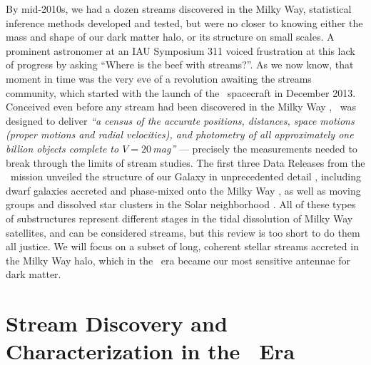 \documentclass[final,5p,times,twocolumn,authoryear]{elsarticle}
\begin{document}
By mid-2010s, we had a dozen streams discovered in the Milky Way, statistical inference methods developed and tested, but were no closer to knowing either the mass and shape of our dark matter halo, or its structure on small scales.
A prominent astronomer at an IAU Symposium 311 voiced frustration at this lack of progress by asking ``Where is the beef with streams?''.
As we now know, that moment in time was the very eve of a revolution awaiting the streams community, which started with the launch of the \gaia\ spacecraft in December 2013.
Conceived even before any stream had been discovered in the Milky Way \citep{lindegren:1993, battrick:1994, lindegren:1996}, \gaia\ was designed to deliver \emph{``a census of the accurate positions, distances, space motions (proper motions and radial velocities), and photometry of all approximately one billion objects complete to $V=20$\,mag''} \citep{perryman:2001} --- precisely the measurements needed to break through the limits of stream studies.
The first three Data Releases from the \gaia\ mission unveiled the structure of our Galaxy in unprecedented detail \citep{babusiaux:2018, helmi:2018, katz:2018, antoja:2021, smart:2021, drimmel:2023, schultheis:2023}, including dwarf galaxies accreted and phase-mixed onto the Milky Way \citep{belokurov:2018, helmi:2018b, myeong:2019, naidu:2020}, as well as moving groups and dissolved star clusters in the Solar neighborhood \citep{antoja:2018, kawata:2018, ramos:2018, meingast:2019, roser:2019}.
All of these types of substructures represent different stages in the tidal dissolution of Milky Way satellites, and can be considered streams, but this review is too short to do them all justice.
We will focus on a subset of long, coherent stellar streams accreted in the Milky Way halo, which in the \gaia\ era became our most sensitive antennae for dark matter.



\section{Stream Discovery and Characterization in the \gaia\ Era}
\label{sec:discovery}
\end{document}
